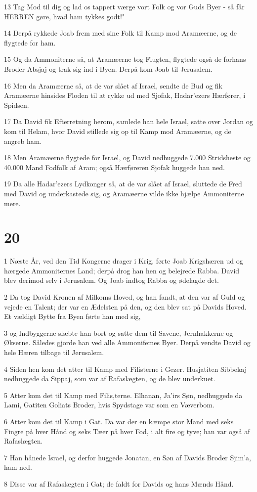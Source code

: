 \par 13 Tag Mod til dig og lad os tappert værge vort Folk og vor Guds Byer - så får HERREN gøre, hvad ham tykkes godt!"
\par 14 Derpå rykkede Joab frem med sine Folk til Kamp mod Aramæerne, og de flygtede for ham.
\par 15 Og da Ammoniterne så, at Aramæerne tog Flugten, flygtede også de forhans Broder Absjaj og trak sig ind i Byen. Derpå kom Joab til Jerusalem.
\par 16 Men da Aramæerne så, at de var slået af Israel, sendte de Bud og fik Aramæerne hinsides Floden til at rykke ud med Sjofak, Hadar'ezers Hærfører, i Spidsen.
\par 17 Da David fik Efterretning herom, samlede han hele Israel, satte over Jordan og kom til Helam, hvor David stillede sig op til Kamp mod Aramæerne, og de angreb ham.
\par 18 Men Aramæerne flygtede for Israel, og David nedhuggede 7.000 Stridsheste og 40.000 Mand Fodfolk af Aram; også Hærføreren Sjofak huggede han ned.
\par 19 Da alle Hadar'ezers Lydkonger så, at de var slået af Israel, sluttede de Fred med David og underkastede sig, og Aramæerne vilde ikke hjælpe Ammoniterne mere.

\chapter{20}

\par 1 Næste År, ved den Tid Kongerne drager i Krig, førte Joab Krigshæren ud og hærgede Ammoniternes Land; derpå drog han hen og belejrede Rabba. David blev derimod selv i Jerusalem. Og Joab indtog Rabba og ødelagde det.
\par 2 Da tog David Kronen af Milkoms Hoved, og han fandt, at den var af Guld og vejede en Talent; der var en Ædelsten på den, og den blev sat på Davids Hoved. Et vældigt Bytte fra Byen førte han med sig,
\par 3 og Indbyggerne slæbte han bort og satte dem til Savene, Jernhakkerne og Økserne. Således gjorde han ved alle Ammonifemes Byer. Derpå vendte David og hele Hæren tilbage til Jerusalem.
\par 4 Siden hen kom det atter til Kamp med Filisterne i Gezer. Husjatiten Sibbekaj nedhuggede da Sippaj, som var af Rafaslægten, og de blev underkuet.
\par 5 Atter kom det til Kamp med Filis,terne. Elhanan, Ja'irs Søn, nedhuggede da Lami, Gatiten Goliats Broder, hvis Spydstage var som en Væverbom.
\par 6 Atter kom det til Kamp i Gat. Da var der en kæmpe stor Mand med seks Fingre på hver Hånd og seks Tæer på hver Fod, i alt fire og tyve; han var også af Rafaslægten.
\par 7 Han hånede Israel, og derfor huggede Jonatan, en Søn af Davids Broder Sjim'a, ham ned.
\par 8 Disse var af Rafaslægten i Gat; de faldt for Davids og hans Mænds Hånd.

